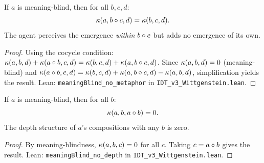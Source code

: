 \begin{theorem}
\label{thm:meaning-blind-no-metaphor}
If $a$ is meaning-blind, then for all $b, c, d$:
\[
\kappa(a, b \circ c, d) = \kappa(b, c, d).
\]
The agent perceives the emergence \emph{within} $b \circ c$ but adds no
emergence of its own.
\end{theorem}

\begin{proof}
Using the cocycle condition: $\kappa(a, b, d) + \kappa(a \circ b, c, d)
= \kappa(b, c, d) + \kappa(a, b \circ c, d)$. Since $\kappa(a, b, d) = 0$
(meaning-blind) and $\kappa(a \circ b, c, d) = \kappa(b, c, d) + \kappa(a,
b \circ c, d) - \kappa(a, b, d)$, simplification yields the result.
Lean: \texttt{meaningBlind\_no\_metaphor} in \texttt{IDT\_v3\_Wittgenstein.lean}.
\end{proof}

\begin{theorem}
\label{thm:meaning-blind-no-depth}
If $a$ is meaning-blind, then for all $b$:
\[
\kappa(a, b, a \circ b) = 0.
\]
The depth structure of $a$'s compositions with any $b$ is zero.
\end{theorem}

\begin{proof}
By meaning-blindness, $\kappa(a, b, c) = 0$ for all $c$. Taking
$c = a \circ b$ gives the result.
Lean: \texttt{meaningBlind\_no\_depth} in \texttt{IDT\_v3\_Wittgenstein.lean}.
\end{proof}

